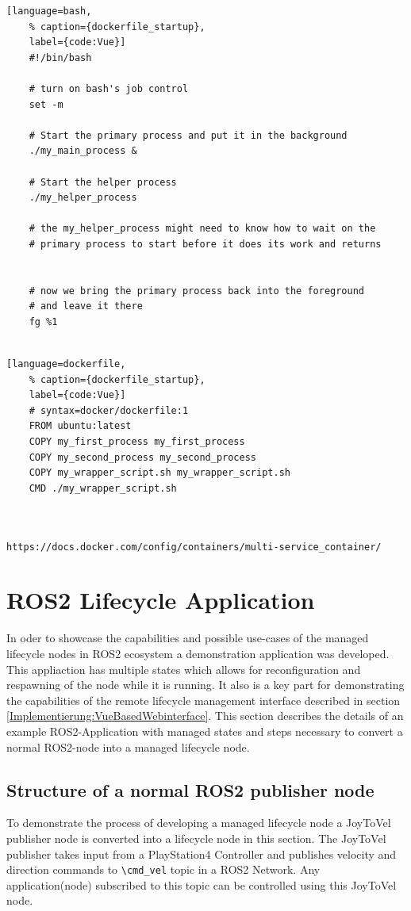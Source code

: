 \begin{lstlisting}[language=bash,
	% caption={dockerfile_startup}, 
	label={code:Vue}]
	#!/bin/bash
  
	# turn on bash's job control
	set -m
	
	# Start the primary process and put it in the background
	./my_main_process &
	
	# Start the helper process
	./my_helper_process
	
	# the my_helper_process might need to know how to wait on the
	# primary process to start before it does its work and returns
	
	
	# now we bring the primary process back into the foreground
	# and leave it there
	fg %1
	
\end{lstlisting}

\begin{lstlisting}[language=dockerfile,
	% caption={dockerfile_startup}, 
	label={code:Vue}]
	# syntax=docker/dockerfile:1
	FROM ubuntu:latest
	COPY my_first_process my_first_process
	COPY my_second_process my_second_process
	COPY my_wrapper_script.sh my_wrapper_script.sh
	CMD ./my_wrapper_script.sh
	
	
\end{lstlisting}

\lstinline{https://docs.docker.com/config/containers/multi-service_container/}

\section{ROS2 Lifecycle Application}
\label{Implementierung:ROS2LifecycleApplication} 
In oder to showcase the capabilities and possible use-cases of the managed lifecycle nodes in ROS2 ecosystem a demonstration application was developed. This appliaction has multiple states which allows for reconfiguration and respawning of the node while it is running. It also is a key part for demonstrating the capabilities of the remote lifecycle management interface described in section \ref{Implementierung:VueBasedWebinterface}. This section describes the details of an example ROS2-Application with managed states and steps necessary to convert a normal ROS2-node into a managed lifecycle node. 

\subsection{Structure of a normal ROS2 publisher node}
To demonstrate the process of developing a managed lifecycle node a JoyToVel publisher node is converted into a lifecycle node in this section. The JoyToVel publisher takes input from a PlayStation4 Controller and publishes velocity and direction commands to \lstinline{\cmd_vel} topic in a ROS2 Network. Any application(node) subscribed to this topic can be controlled using this JoyToVel node.


